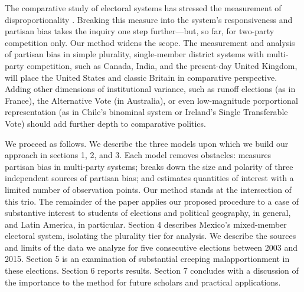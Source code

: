 \documentclass[letter,12pt]{article}
\begin{document}
The comparative study of electoral systems has stressed the measurement of disproportionality \citep{lijphartElSysPtySys.1994}. Breaking this measure into the system's responsiveness and partisan bias takes the inquiry one step further---but, so far, for two-party competition only. Our method widens the scope. The measurement and analysis of partisan bias in simple plurality, single-member district systems with multi-party competition, such as Canada, India, and the present-day United Kingdom, will place the United States and classic Britain in comparative perspective. Adding other dimensions of institutional variance, such as runoff elections (as in France), the Alternative Vote (in Australia), or even low-magnitude porportional representation (as in Chile's binominal system or Ireland's Single Transferable Vote) should add further depth to comparative politics. 


We proceed as follows. We describe the three models upon which we build our approach in sections 1, 2, and 3. Each model removes obstacles: \citet{king.1990elRespBiasMultiparty} measures partisan bias in multi-party systems; \citet{grofman.etalBiasMalapp.1997} breaks down the size and polarity of three independent sources of partisan bias; and \citet{linzerSeatVoteElasticity2012} estimates quantities of interest with a limited number of observation points. Our method stands at the intersection of this trio. The remainder of the paper applies our proposed procedure to a case of substantive interest to students of elections and political geography, in general, and Latin America, in particular. Section 4 describes Mexico's mixed-member electoral system, isolating the plurality tier for analysis. We describe the sources and limits of the data we analyze for five consecutive elections between 2003 and 2015. Section 5 is an examination of substantial creeping malapportionment in these elections. Section 6 reports results. Section 7 concludes with a discussion of the importance to the method for future scholars and practical applications. 
\end{document}
